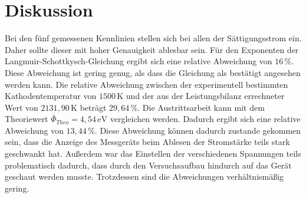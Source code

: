 \section{Diskussion}
\label{sec:Diskussion}
Bei den fünf gemessenen Kennlinien stellen sich bei allen der 
Sättigungsstrom ein. Daher sollte dieser mit hoher Genauigkeit ablesbar sein. 
Für den Exponenten der Langmuir-Schottkysch-Gleichung ergibt sich eine relative Abweichung von 
$16 \, \%$. Diese Abweichung ist gering genug, als dass die Gleichung als bestätigt angesehen werden kann.
Die relative Abweichung zwischen der experimentell bestimmten Kathodentemperatur von $1500 \, \unit{\kelvin}$ 
und der aus der Leistungsbilanz errechneter Wert von $2131,90 \, \unit{\kelvin}$ beträgt $29,64 \, \%$.
Die Austrittsarbeit kann mit dem Theoriewert $\bar{\Phi}_{Theo} = 4,54 \, \unit{\eV}$ vergleichen werden. 
Dadurch ergibt sich eine relative Abweichung von $13,44 \, \%$. 
Diese Abweichung können dadurch zustande gekommen sein, dass die Anzeige des Messgeräts beim Ablesen der Stromstärke 
teils stark geschwankt hat. Außerdem war das Einstellen der verschiedenen Spannungen teils 
problematisch dadurch, dass durch den Versuchsaufbau hindurch auf das Gerät geschaut werden musste. 
Trotzdessen sind die Abweichungen verhältnismäßig gering. 